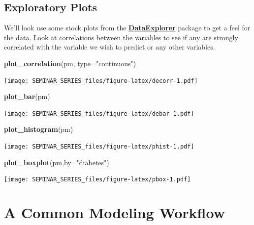 \documentclass[]{book}
\newenvironment{Shaded}{\begin{snugshade}}{\end{snugshade}}
\newcommand{\KeywordTok}[1]{\textcolor[rgb]{0.13,0.29,0.53}{\textbf{#1}}}
\newcommand{\DataTypeTok}[1]{\textcolor[rgb]{0.13,0.29,0.53}{#1}}
\newcommand{\StringTok}[1]{\textcolor[rgb]{0.31,0.60,0.02}{#1}}
\newcommand{\NormalTok}[1]{#1}
\begin{document}
\section{Exploratory Plots}\label{exploratory-plots}

We'll look use some stock plots from the
\href{https://github.com/elastacloud/automatic-data-explorer}{\textbf{DataExplorer}}
package to get a feel for the data. Look at correlations between the
variables to see if any are strongly correlated with the variable we
wish to predict or any other variables.

\begin{Shaded}
\begin{Highlighting}[]
\KeywordTok{plot_correlation}\NormalTok{(pm, }\DataTypeTok{type=}\StringTok{"continuous"}\NormalTok{)}
\end{Highlighting}
\end{Shaded}

\texttt{[image: SEMINAR\_SERIES\_files/figure-latex/decorr-1.pdf]}

\begin{Shaded}
\begin{Highlighting}[]
\KeywordTok{plot_bar}\NormalTok{(pm)}
\end{Highlighting}
\end{Shaded}

\texttt{[image: SEMINAR\_SERIES\_files/figure-latex/debar-1.pdf]}

\begin{Shaded}
\begin{Highlighting}[]
\KeywordTok{plot_histogram}\NormalTok{(pm)}
\end{Highlighting}
\end{Shaded}

\texttt{[image: SEMINAR\_SERIES\_files/figure-latex/phist-1.pdf]}

\begin{Shaded}
\begin{Highlighting}[]
\KeywordTok{plot_boxplot}\NormalTok{(pm,}\DataTypeTok{by=}\StringTok{"diabetes"}\NormalTok{)}
\end{Highlighting}
\end{Shaded}

\texttt{[image: SEMINAR\_SERIES\_files/figure-latex/pbox-1.pdf]}

\chapter{A Common Modeling Workflow}\label{a-common-modeling-workflow}
\end{document}
